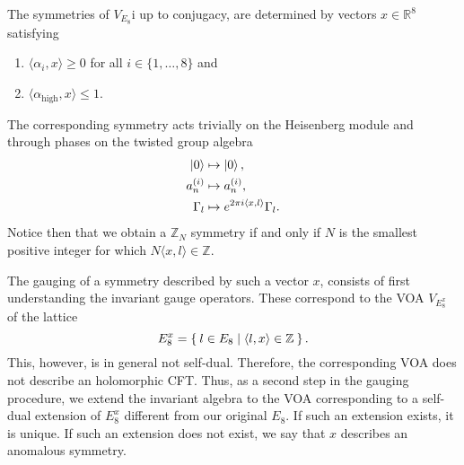 \documentclass{article}
\begin{document}
The symmetries of $V_{E_8}$i up to conjugacy, are determined by vectors $x\in\mathbb{R}^8$ satisfying
\begin{enumerate}
    \item $\langle\alpha_i,x\rangle\geq 0$ for all $i\in\{1,\dots,8\}$ and
    \item $\langle\alpha_{\text{high}},x\rangle\leq 1$. 
\end{enumerate}
The corresponding symmetry acts trivially on the Heisenberg module and through phases on the twisted group algebra
\begin{equation}
    \begin{aligned}
    \ket{0}&\mapsto\ket{0},\\
    a_n^{(i)}&\mapsto a_n^{(i)},\\
    \Gamma_l&\mapsto e^{2\pi i\ev{x,l}}\Gamma_l.
    \end{aligned}
\end{equation}
Notice then that we obtain a $\mathbb{Z}_N$ symmetry if and only if $N$ is the smallest positive integer for which $N\langle x,l\rangle\in\mathbb{Z}$. 

The gauging of a symmetry described by such a vector $x$, consists of first understanding the invariant gauge operators. These correspond to the VOA $V_{E_8^x}$ of the lattice
\begin{equation}
    E_8^x=\Set{l\in E_8|\langle l,x\rangle\in\mathbb{Z}}.
\end{equation}
This, however, is in general not self-dual. Therefore, the corresponding VOA does not describe an holomorphic CFT. Thus, as a second step in the gauging procedure, we extend the invariant algebra to the VOA corresponding to a self-dual extension of $E_8^x$ different from our original $E_8$. If such an extension exists, it is unique. If such an extension does not exist, we say that $x$ describes an anomalous symmetry.
\end{document}
